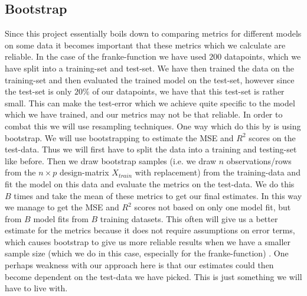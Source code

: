 \documentclass{article}
\begin{document}
\subsection{Bootstrap}
Since this project essentially boils down to comparing metrics for different
models on some data it becomes important that these metrics which we calculate
are reliable. In the case of the franke-function we have used $200$ datapoints,
which we have split into a training-set and test-set. We have then trained the
data on the training-set and then evaluated the trained model on the test-set,
however since the test-set is only $20\%$ of our datapoints, we have that this
test-set is rather small. This can make the test-error which we achieve quite
specific to the model which we have trained, and our metrics may not be that
reliable. In order to combat this we will use resampling techniques. One way
which do this by is using bootstrap. We will use bootstrapping to estimate the
MSE and $R^2$ scores on the test-data. Thus we will first have to split the data
into a training and testing-set like before. Then we draw bootstrap samples
(i.e. we draw $n$ observations/rows from the $n\times p$ design-matrix $X_{train}$
with replacement) from the training-data and fit the model on this data and
evaluate the metrics on the test-data. We do this $B$ times and take the mean of
these metrics to get our final estimates. In this way we manage to get the MSE
and $R^2$ scores not based on only one model fit, but from $B$ model fits from
$B$ training datasets. This often will give us a better estimate for the metrics
because it does not require assumptions on error terms, which causes bootstrap
to give us more reliable results when we have a smaller sample size (which we do
in this case, especially for the franke-function) \cite[s.~5.3]{lecturenotes5}.
One perhaps weakness with our approach here is that our estimates could then
become dependent on the test-data we have picked. This is just something we will
have to live with.
\end{document}
